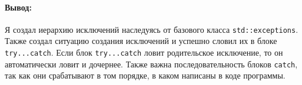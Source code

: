 \paragraph{Вывод:}
\begin{sloppypar}
    Я создал иерархию исключений наследуясь от базового класса \texttt{std::exceptions}.
    Также создал ситуацию создания исключений и успешно словил их в блоке \texttt{try...catch}.
    Если блок \texttt{try...catch} ловит родительское исключение, то он автоматически ловит и дочернее.
    Также важна последовательность блоков \texttt{catch}, так как они срабатывают в том порядке, в каком написаны в коде программы.
\end{sloppypar}
